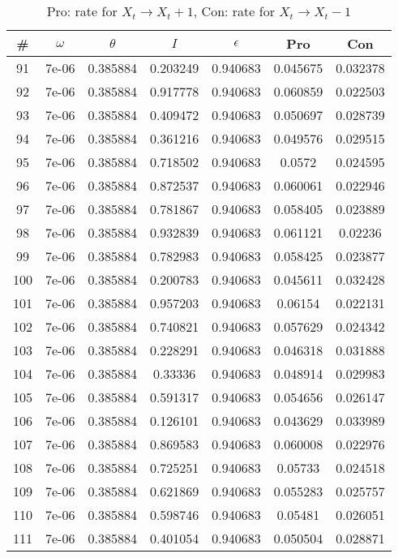 \newpage
\begin{table}
\caption{Pro: rate for $X_t \rightarrow X_t + 1$, Con: rate for $X_t \rightarrow X_t - 1$}
\begin{tabular*}{\linewidth}{c|c|c|c|c|c|c}
\# & $\omega$ & $\theta$ & $I$ & $\epsilon$ & Pro & Con \\
\hline
91 & 7e-06 & 0.385884 & 0.203249 & 0.940683 & 0.045675 & 0.032378\\
92 & 7e-06 & 0.385884 & 0.917778 & 0.940683 & 0.060859 & 0.022503\\
93 & 7e-06 & 0.385884 & 0.409472 & 0.940683 & 0.050697 & 0.028739\\
94 & 7e-06 & 0.385884 & 0.361216 & 0.940683 & 0.049576 & 0.029515\\
95 & 7e-06 & 0.385884 & 0.718502 & 0.940683 & 0.0572 & 0.024595\\
96 & 7e-06 & 0.385884 & 0.872537 & 0.940683 & 0.060061 & 0.022946\\
97 & 7e-06 & 0.385884 & 0.781867 & 0.940683 & 0.058405 & 0.023889\\
98 & 7e-06 & 0.385884 & 0.932839 & 0.940683 & 0.061121 & 0.02236\\
99 & 7e-06 & 0.385884 & 0.782983 & 0.940683 & 0.058425 & 0.023877\\
100 & 7e-06 & 0.385884 & 0.200783 & 0.940683 & 0.045611 & 0.032428\\
101 & 7e-06 & 0.385884 & 0.957203 & 0.940683 & 0.06154 & 0.022131\\
102 & 7e-06 & 0.385884 & 0.740821 & 0.940683 & 0.057629 & 0.024342\\
103 & 7e-06 & 0.385884 & 0.228291 & 0.940683 & 0.046318 & 0.031888\\
104 & 7e-06 & 0.385884 & 0.33336 & 0.940683 & 0.048914 & 0.029983\\
105 & 7e-06 & 0.385884 & 0.591317 & 0.940683 & 0.054656 & 0.026147\\
106 & 7e-06 & 0.385884 & 0.126101 & 0.940683 & 0.043629 & 0.033989\\
107 & 7e-06 & 0.385884 & 0.869583 & 0.940683 & 0.060008 & 0.022976\\
108 & 7e-06 & 0.385884 & 0.725251 & 0.940683 & 0.05733 & 0.024518\\
109 & 7e-06 & 0.385884 & 0.621869 & 0.940683 & 0.055283 & 0.025757\\
110 & 7e-06 & 0.385884 & 0.598746 & 0.940683 & 0.05481 & 0.026051\\
111 & 7e-06 & 0.385884 & 0.401054 & 0.940683 & 0.050504 & 0.028871\\

\end{tabular*}
\end{table}
